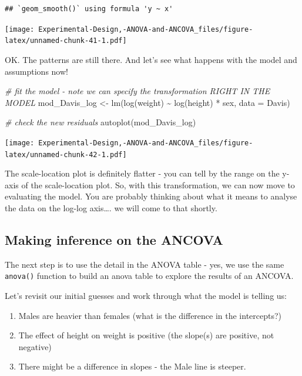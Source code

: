 \documentclass[
]{book}
\newenvironment{Shaded}{\begin{snugshade}}{\end{snugshade}}
\newcommand{\AttributeTok}[1]{\textcolor[rgb]{0.77,0.63,0.00}{#1}}
\newcommand{\CommentTok}[1]{\textcolor[rgb]{0.56,0.35,0.01}{\textit{#1}}}
\newcommand{\FunctionTok}[1]{\textcolor[rgb]{0.00,0.00,0.00}{#1}}
\newcommand{\NormalTok}[1]{#1}
\newcommand{\OtherTok}[1]{\textcolor[rgb]{0.56,0.35,0.01}{#1}}
\newcommand{\SpecialCharTok}[1]{\textcolor[rgb]{0.00,0.00,0.00}{#1}}
\providecommand{\tightlist}{%
  \setlength{\itemsep}{0pt}\setlength{\parskip}{0pt}}
\begin{document}
\begin{verbatim}
## `geom_smooth()` using formula 'y ~ x'
\end{verbatim}

\texttt{[image: Experimental-Design,-ANOVA-and-ANCOVA\_files/figure-latex/unnamed-chunk-41-1.pdf]}

OK. The patterns are still there. And let's see what happens with the model and assumptions now!

\begin{Shaded}
\begin{Highlighting}[]
\CommentTok{\# fit the model {-} note we can specify the transformation RIGHT IN THE MODEL}
\NormalTok{mod\_Davis\_log }\OtherTok{\textless{}{-}} \FunctionTok{lm}\NormalTok{(}\FunctionTok{log}\NormalTok{(weight) }\SpecialCharTok{\textasciitilde{}} \FunctionTok{log}\NormalTok{(height) }\SpecialCharTok{*}\NormalTok{ sex, }\AttributeTok{data =}\NormalTok{ Davis)}

\CommentTok{\# check the new residuals}
\FunctionTok{autoplot}\NormalTok{(mod\_Davis\_log)}
\end{Highlighting}
\end{Shaded}

\texttt{[image: Experimental-Design,-ANOVA-and-ANCOVA\_files/figure-latex/unnamed-chunk-42-1.pdf]}

The scale-location plot is definitely flatter - you can tell by the range on the y-axis of the scale-location plot. So, with this transformation, we can now move to evaluating the model. You are probably thinking about what it means to analyse the data on the log-log axis\ldots. we will come to that shortly.

\hypertarget{making-inference-on-the-ancova}{%
\subsection{Making inference on the ANCOVA}\label{making-inference-on-the-ancova}}

The next step is to use the detail in the ANOVA table - yes, we use the same \texttt{anova()} function to build an anova table to explore the results of an ANCOVA.

Let's revisit our initial guesses and work through what the model is telling us:

\begin{enumerate}
\def\labelenumi{\arabic{enumi}.}
\tightlist
\item
  Males are heavier than females (what is the difference in the intercepts?)
\item
  The effect of height on weight is positive (the slope(s) are positive, not negative)
\item
  There might be a difference in slopes - the Male line is steeper.
\end{enumerate}
\end{document}
